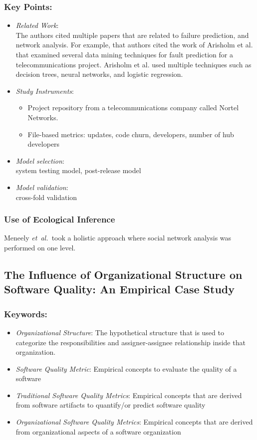 \documentclass{sig-alternate-05-2015}
\newcommand{\etal}{\mbox{\emph{et al.\ }}}
\begin{document}
\subsubsection{Key Points:}
\begin{itemize}
\item \emph{Related Work}: \\
The authors cited multiple papers that are related to failure prediction, and network analysis. For example, that authors cited the work of Arisholm et al. \cite{Arisholm:2010} that examined several data mining techniques for fault prediction for a telecommunications project. Arisholm et al. used multiple techniques such as decision trees, neural networks, and logistic regression.
\item \emph{Study Instruments}:
	\begin{itemize}
		\item Project repository from a telecommunications company called Nortel Networks.
		\item File-based metrics: updates, code churn, developers, number of hub developers
	\end{itemize}
\item \emph{Model selection}: \\
system testing model, post-release model
\item \emph{Model validation}: \\
cross-fold validation
\end{itemize}

\subsubsection{Use of Ecological Inference}
Meneely \etal took a holistic approach where social network analysis was performed on one level.

\subsection{The Influence of Organizational Structure on Software Quality: An Empirical Case Study \cite{Nagappan:2008}}

\subsubsection{Keywords:}
\begin{itemize}
\item \emph{Organizational Structure}: The hypothetical structure that is used to categorize the responsibilities and assigner-assignee relationship inside that organization.
\item \emph{Software Quality Metric}: Empirical concepts to evaluate the quality of a software
\item \emph{Traditional Software Quality Metrics}: Empirical concepts that are derived from software artifacts to quantify/or predict software quality
\item \emph{Organizational Software Quality Metrics}: Empirical concepts that are derived from organizational aspects of a software organization
\end{itemize} 
\end{document}

